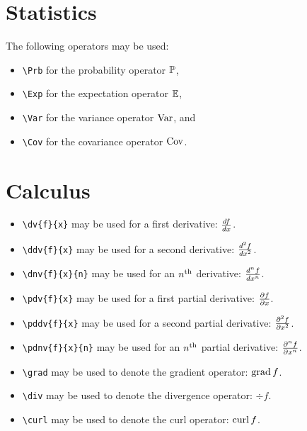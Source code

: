 \documentclass{mszreport}
\begin{document}
\section{Statistics}

The following operators may be used:
\begin{itemize}
    \item \verb|\Prb| for the probability operator $\operatorname*{\mathbb{P}}$,
    \item \verb|\Exp| for the expectation operator $\operatorname*{\mathbb{E}}$,
    \item \verb|\Var| for the variance operator $\operatorname{Var}$, and
    \item \verb|\Cov| for the covariance operator $\operatorname{Cov}$.
\end{itemize}

\section{Calculus}

\begin{itemize}
    \item \verb|\dv{f}{x}| may be used for a first derivative: $\dv{f}{x}$.
    \item \verb|\ddv{f}{x}| may be used for a second derivative: $\ddv{f}{x}$.
    \item \verb|\dnv{f}{x}{n}| may be used for an $n^{\text{th}}$ derivative: $\dnv{f}{x}{n}$.
    \item \verb|\pdv{f}{x}| may be used for a first partial derivative: $\pdv{f}{x}$.
    \item \verb|\pddv{f}{x}| may be used for a second partial derivative: $\pddv{f}{x}$.
    \item \verb|\pdnv{f}{x}{n}| may be used for an $n^{\text{th}}$ partial derivative: $\pdnv{f}{x}{n}$.
    \item \verb|\grad| may be used to denote the gradient operator: $\operatorname{grad}{f}$.
    \item \verb|\div| may be used to denote the divergence operator: $\div{f}$.
    \item \verb|\curl| may be used to denote the curl operator: $\operatorname{curl}{f}$.
\end{itemize}
\end{document}
